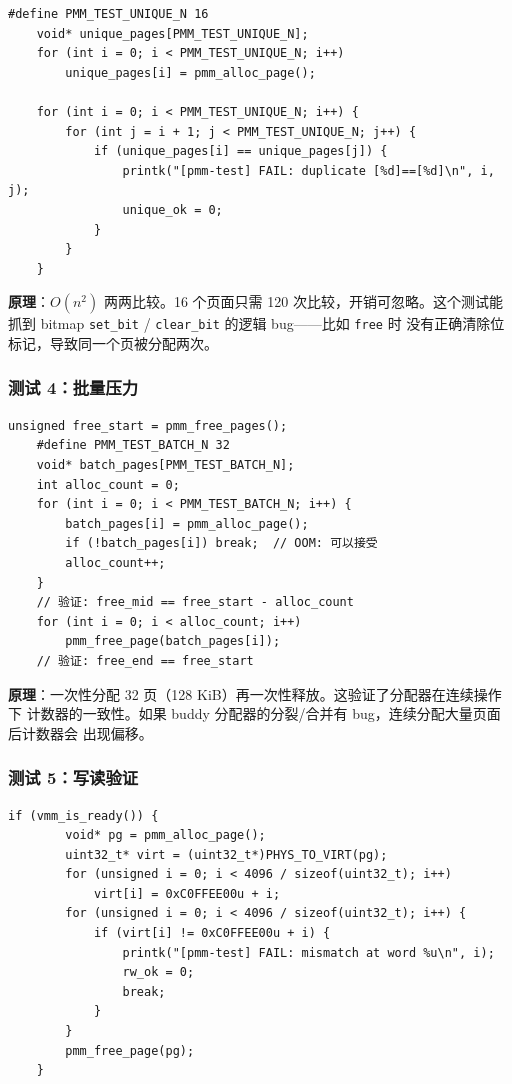 \begin{lstlisting}[style=cstyle]
    #define PMM_TEST_UNIQUE_N 16
    void* unique_pages[PMM_TEST_UNIQUE_N];
    for (int i = 0; i < PMM_TEST_UNIQUE_N; i++)
        unique_pages[i] = pmm_alloc_page();

    for (int i = 0; i < PMM_TEST_UNIQUE_N; i++) {
        for (int j = i + 1; j < PMM_TEST_UNIQUE_N; j++) {
            if (unique_pages[i] == unique_pages[j]) {
                printk("[pmm-test] FAIL: duplicate [%d]==[%d]\n", i, j);
                unique_ok = 0;
            }
        }
    }
\end{lstlisting}

\textbf{原理}：$O(n^2)$ 两两比较。16 个页面只需 120 次比较，开销可忽略。这个测试能
抓到 bitmap \texttt{set\_bit} / \texttt{clear\_bit} 的逻辑 bug——比如 \texttt{free} 时
没有正确清除位标记，导致同一个页被分配两次。

\subsubsection{测试 4：批量压力}

\begin{lstlisting}[style=cstyle]
    unsigned free_start = pmm_free_pages();
    #define PMM_TEST_BATCH_N 32
    void* batch_pages[PMM_TEST_BATCH_N];
    int alloc_count = 0;
    for (int i = 0; i < PMM_TEST_BATCH_N; i++) {
        batch_pages[i] = pmm_alloc_page();
        if (!batch_pages[i]) break;  // OOM: 可以接受
        alloc_count++;
    }
    // 验证: free_mid == free_start - alloc_count
    for (int i = 0; i < alloc_count; i++)
        pmm_free_page(batch_pages[i]);
    // 验证: free_end == free_start
\end{lstlisting}

\textbf{原理}：一次性分配 32 页（128 KiB）再一次性释放。这验证了分配器在连续操作下
计数器的一致性。如果 buddy 分配器的分裂/合并有 bug，连续分配大量页面后计数器会
出现偏移。

\subsubsection{测试 5：写读验证}

\begin{lstlisting}[style=cstyle]
    if (vmm_is_ready()) {
        void* pg = pmm_alloc_page();
        uint32_t* virt = (uint32_t*)PHYS_TO_VIRT(pg);
        for (unsigned i = 0; i < 4096 / sizeof(uint32_t); i++)
            virt[i] = 0xC0FFEE00u + i;
        for (unsigned i = 0; i < 4096 / sizeof(uint32_t); i++) {
            if (virt[i] != 0xC0FFEE00u + i) {
                printk("[pmm-test] FAIL: mismatch at word %u\n", i);
                rw_ok = 0;
                break;
            }
        }
        pmm_free_page(pg);
    }
\end{lstlisting}

